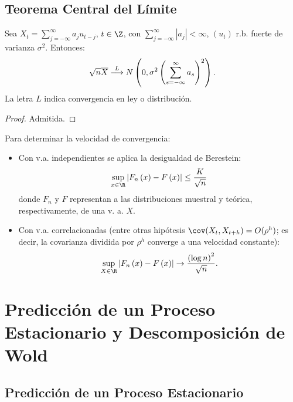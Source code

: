 \subsection{Teorema Central del L\'{i}mite}

\begin{teorema}
Sea $\displaystyle X_{t} =\sum_{j=-\infty }^\infty {a_{j} 
u_{t-j} }$, $t\in \Z$, con $\displaystyle\sum_{j=-\infty}^\infty {\left| {a_{j} } \right|} <\infty$, $\left( {u_{t} } \right)$ r.b. fuerte de varianza $\sigma^{2}$. Entonces: 
\[
\sqrt n \overline{{X}}\buildrel L \over \longrightarrow N\left( {0,\sigma 
^{2}\left( {\sum_{s=-\infty }^\infty {a_{s} } } \right)^{2}} \right).
\]
La letra $L$ indica convergencia en ley o distribuci\'{o}n.
\end{teorema}

\begin{proof}
 Admitida.
\end{proof}

\begin{observacion}
Para determinar la velocidad de convergencia:
\begin{itemize}
\item Con v.a. independientes se aplica la desigualdad de Berestein:
\[
\sup_{x\in \R} \left| {F_{n} \left( x \right)-F\left( x \right)} \right|\leq \frac{K}{\sqrt n }
\]
donde $F_{n} $ y $F$ representan a las distribuciones muestral y te\'{o}rica, respectivamente, de una v. a. $X$. 

\item Con v.a. correlacionadas (entre otras hip\'{o}tesis $\cov(X_{t} ,X_{t+h} )=O(\rho^{h})$; es decir, la covarianza dividida por $\rho^{h}$ converge a una velocidad constante):
\[
\sup_{X\in \R} \left| {F_{n} \left( x \right)-F\left( x \right)} 
\right|\to \frac{\left( {\log n} \right)^{2}}{\sqrt n }.
\]
\end{itemize}
\end{observacion}


\section{Predicci\'{o}n de un Proceso Estacionario y Descomposici\'{o}n de Wold}
\subsection{Predicci\'{o}n de un Proceso Estacionario}

